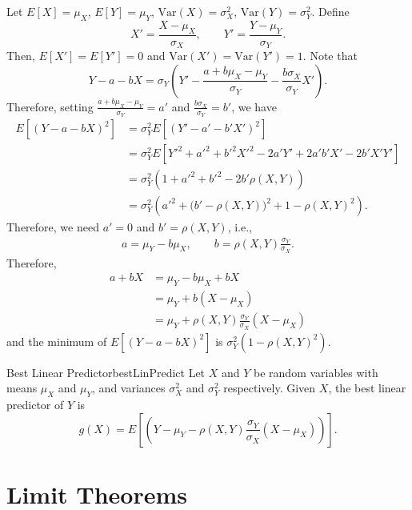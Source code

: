 \documentclass[math]{amznotes}
\theoremstyle{remark}
\begin{document}
Let $E[X] = \mu_X$, $E[Y] = \mu_Y$, $\mathrm{Var}(X) = \sigma_X^2$, $\mathrm{Var}(Y) = \sigma_Y^2$. Define
\begin{equation*}
    X' = \frac{X - \mu_X}{\sigma_X}, \qquad Y' = \frac{Y - \mu_Y}{\sigma_Y}.
\end{equation*}
Then, $E\left[X'\right] = E\left[Y'\right] = 0$ and $\mathrm{Var}(X') = \mathrm{Var}(Y') = 1$. Note that
\begin{equation*}
    Y - a - bX = \sigma_Y\left(Y' - \frac{a + b\mu_X - \mu_Y}{\sigma_Y} - \frac{b\sigma_X}{\sigma_Y}X'\right).    
\end{equation*}
Therefore, setting $\frac{a + b\mu_X - \mu_Y}{\sigma_Y} = a'$ and $\frac{b\sigma_X}{\sigma_Y} = b'$, we have 
\begin{align*}
    E\left[(Y - a - bX)^2\right] & = \sigma_Y^2E\left[\left(Y' - a' - b'X'\right)^2\right] \\
    & = \sigma_Y^2E\left[Y'^2 + a'^2 + b'^2X'^2 - 2a'Y' + 2a'b'X' - 2b'X'Y'\right] \\
    & = \sigma_Y^2\left(1 + a'^2 + b'^2 - 2b'\rho(X, Y)\right) \\
    & = \sigma_Y^2\left(a'^2 + \bigl(b' - \rho(X, Y)\bigr)^2 + 1 - \rho(X, Y)^2\right).
\end{align*}
Therefore, we need $a' = 0$ and $b' = \rho(X, Y)$, i.e.,
\begin{align*}
    a = \mu_Y - b\mu_X, \qquad b = \rho(X, Y)\frac{\sigma_Y}{\sigma_X}.
\end{align*}
Therefore, 
\begin{align*}
    a + bX & = \mu_Y - b\mu_X + bX \\
    & = \mu_Y + b(X - \mu_X) \\
    & = \mu_Y + \rho(X, Y)\frac{\sigma_Y}{\sigma_X}(X - \mu_X)
\end{align*}
and the minimum of $E\left[(Y - a - bX)^2\right]$ is $\sigma_Y^2\left(1 - \rho(X, Y)^2\right)$.
\begin{thmbox}{Best Linear Predictor}{bestLinPredict}
    Let $X$ and $Y$ be random variables with means $\mu_X$ and $\mu_Y$, and variances $\sigma_X^2$ and $\sigma_Y^2$ respectively. Given $X$, the best linear predictor of $Y$ is
    \begin{equation*}
        g(X) = E\left[\left(Y - \mu_Y - \rho(X, Y)\frac{\sigma_Y}{\sigma_X}(X - \mu_X)\right)\right].
    \end{equation*}
\end{thmbox}
\chapter{Limit Theorems}
\end{document}
